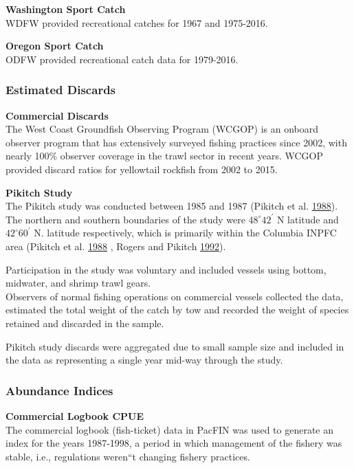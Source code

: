 \documentclass[12pt,]{article}
\begin{document}
\textbf{Washington Sport Catch}\\
WDFW provided recreational catches for 1967 and 1975-2016.

\textbf{Oregon Sport Catch}\\
ODFW provided recreational catch data for 1979-2016.

\subsubsection{Estimated Discards}\label{estimated-discards}

\textbf{Commercial Discards}\\
The West Coast Groundfish Observing Program (WCGOP) is an onboard
observer program that has extensively surveyed fishing practices since
2002, with nearly 100\% observer coverage in the trawl sector in recent
years. WCGOP provided discard ratios for yellowtail rockfish from 2002
to 2015.

\textbf{Pikitch Study}\\
The Pikitch study was conducted between 1985 and 1987 (Pikitch et al.
\protect\hyperlink{ref-Pikitch1988}{1988}). The northern and southern
boundaries of the study were \(48^\circ 42^\prime\) N latitude and
\(42^\circ 60^\prime\) N. latitude respectively, which is primarily
within the Columbia INPFC area (Pikitch et al.
\protect\hyperlink{ref-Pikitch1988}{1988} , Rogers and Pikitch
\protect\hyperlink{ref-Rogers1992}{1992}).

Participation in the study was voluntary and included vessels using
bottom, midwater, and shrimp trawl gears.\\
Observers of normal fishing operations on commercial vessels collected
the data, estimated the total weight of the catch by tow and recorded
the weight of species retained and discarded in the sample.

Pikitch study discards were aggregated due to small sample size and
included in the data as representing a single year mid-way through the
study.

\subsubsection{Abundance Indices}\label{abundance-indices}

\textbf{Commercial Logbook CPUE}\\
The commercial logbook (fish-ticket) data in PacFIN was used to generate
an index for the years 1987-1998, a period in which management of the
fishery was stable, i.e., regulations weren``t changing fishery
practices.
\end{document}
